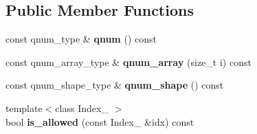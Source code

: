 \subsection*{Public Member Functions}
\begin{DoxyCompactItemize}
\item 
\hypertarget{classbtas_1_1_sp_shape_3_010ul_00_01_q_01_4_ab15578efdd7ed9e9b516bbbf3a8bd9aa}{
const qnum\_\-type \& {\bfseries qnum} () const }
\label{classbtas_1_1_sp_shape_3_010ul_00_01_q_01_4_ab15578efdd7ed9e9b516bbbf3a8bd9aa}

\item 
\hypertarget{classbtas_1_1_sp_shape_3_010ul_00_01_q_01_4_a5c0dce926a18f0caabe3f352ad912733}{
const qnum\_\-array\_\-type \& {\bfseries qnum\_\-array} (size\_\-t i) const }
\label{classbtas_1_1_sp_shape_3_010ul_00_01_q_01_4_a5c0dce926a18f0caabe3f352ad912733}

\item 
\hypertarget{classbtas_1_1_sp_shape_3_010ul_00_01_q_01_4_a9f679ffbec1830eed7523e463fe9d488}{
const qnum\_\-shape\_\-type \& {\bfseries qnum\_\-shape} () const }
\label{classbtas_1_1_sp_shape_3_010ul_00_01_q_01_4_a9f679ffbec1830eed7523e463fe9d488}

\item 
\hypertarget{classbtas_1_1_sp_shape_3_010ul_00_01_q_01_4_ab1b35390f8e72a2df3f4e7168f4af200}{
{\footnotesize template$<$class Index\_\- $>$ }\\bool {\bfseries is\_\-allowed} (const Index\_\- \&idx) const }
\label{classbtas_1_1_sp_shape_3_010ul_00_01_q_01_4_ab1b35390f8e72a2df3f4e7168f4af200}

\end{DoxyCompactItemize}
